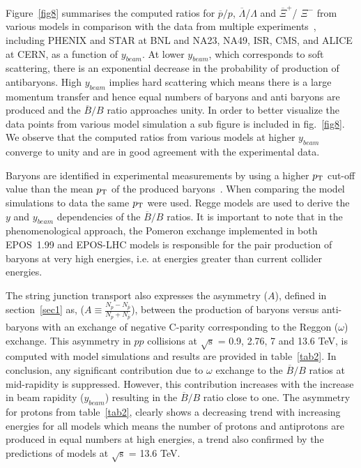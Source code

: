 \documentclass{article}
\newcommand{\sqrts}{\mbox{$\sqrt{\mathrm{s}}$}}
\newcommand{\axi}{$\overline{\Xi}^+$}
\newcommand{\xim}{$\Xi^-$}
\newcommand{\alam}{$\overline{\Lambda}$}
\newcommand{\lam}{$\Lambda$}
\newcommand{\ppt}{$p_{\rm T}$}
\begin{document}
Figure~\ref{fig8} summarises the computed ratios for $\overline{p}/p$, {\alam /\lam} and {\axi / \xim} from various models in comparison with the data from multiple  experiments~\cite{47, 48, 49, 50, 51, 52, 53, 54, 55, 56, 57, 58, 59}, including PHENIX and STAR at BNL and NA23, NA49, ISR, CMS, and ALICE at CERN, as a function of $y_{beam}$. At lower $y_{beam}$, which corresponds to soft scattering, there is an exponential decrease in the probability of production of antibaryons. High $y_{beam} $ implies hard scattering which means there is a large momentum transfer and hence equal numbers of baryons and anti baryons are produced and the $\overline{B}/B$ ratio approaches unity. In order to better visualize the data points from various model simulation a sub figure is included in fig.~\ref{fig8}. We observe that the computed ratios from various models at higher $y_{beam}$ converge to unity and are in good agreement with the experimental data. 


 Baryons are identified in experimental measurements by using a higher {\ppt} cut-off value than the mean {\ppt} of the produced baryons~\cite{20}. When comparing the model simulations to data the same {\ppt} were used. Regge models are used to derive the $y$ and $y_{beam}$ dependencies of the $\overline{B}/B$ ratios. It is important to note that in the phenomenological approach, the Pomeron exchange implemented in both EPOS~1.99 and EPOS-LHC models is responsible for the pair production of baryons at very high energies, i.e. at energies greater than current collider energies. 
 
 The string junction transport also expresses the asymmetry ($A$), defined in section~\ref{sec1} as, ($A \equiv \frac{N_{p} - N_{\bar{p}}}{N_{p} + N_{\bar{p}}}$), between the production of baryons versus anti-baryons with an exchange of negative C-parity corresponding to the Reggon ($\omega$) exchange. This asymmetry in $pp$ collisions at {\sqrts} = 0.9, 2.76, 7 and 13.6 TeV, is computed with model simulations and results are provided in table~\ref{tab2}. In conclusion, any significant contribution due to $\omega$ exchange to the $\overline{B}/B$ ratios at mid-rapidity is suppressed. However, this contribution increases with the increase in beam rapidity ($y_{beam}$) resulting in the $\overline{B}/B$ ratio close to one. The asymmetry for protons from table~\ref{tab2}, clearly shows a decreasing trend with increasing energies for all models which means the number of protons and antiprotons are produced in equal numbers at high energies, a trend also confirmed by the predictions of models at {\sqrts} = 13.6 TeV.
 
\end{document}
